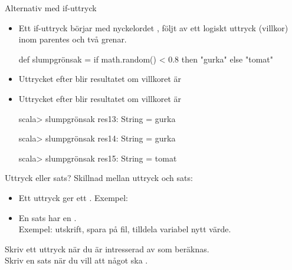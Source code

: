 \begin{Slide}{Alternativ med if-uttryck}
\begin{itemize}
\item Ett if-uttryck börjar med nyckelordet , följt av ett logiskt uttryck (villkor) inom parentes och två grenar.
\begin{Code}
def slumpgrönsak = if math.random() < 0.8 then "gurka" else "tomat"
\end{Code}
\item Uttrycket efter  blir resultatet om villkoret är 
\item Uttrycket efter  blir resultatet om villkoret är 
\begin{REPLnonum}
scala> slumpgrönsak
res13: String = gurka

scala> slumpgrönsak
res14: String = gurka

scala> slumpgrönsak
res15: String = tomat

\end{REPLnonum}
\end{itemize}
\end{Slide}


\begin{Slide}{Uttryck eller sats?}
Skillnad mellan uttryck och sats:
\begin{itemize}
\item Ett uttryck ger ett . Exempel: 
\item En sats har en . \\Exempel: utskrift, spara på fil, tilldela variabel nytt värde.
\end{itemize}
Skriv ett uttryck när du är intresserad av  som beräknas.\\
Skriv en sats när du vill att något ska .\\~\\
\end{Slide}


